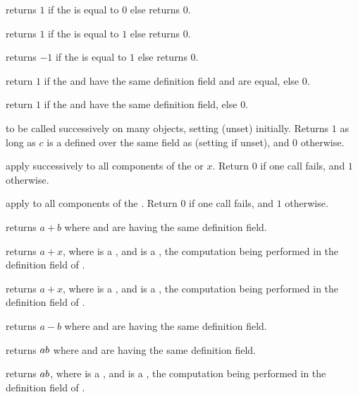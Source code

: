  returns $1$ if the   is equal
to $0$ else returns $0$.

 returns $1$ if the   is equal
to $1$ else returns $0$.

 returns $-1$ if the   is equal
to $1$ else returns $0$.

 return $1$ if the   and
 have the same definition field and are equal, else $0$.

 return $1$ if the   and
 have the same definition field, else $0$.

 to be called successively on many objects,
setting  (unset) initially. Returns $1$ as long as $c$ is a
 defined over the same field as  (setting 
if unset), and $0$ otherwise.

 apply  successively to all
components of the  or  $x$. Return $0$ if one call fails,
and $1$ otherwise.

 apply  to all components
of the . Return $0$ if one call fails, and $1$ otherwise.

 returns $a+b$ where  and  are
 having the same definition field.

 returns $a+x$, where  is a
, and  is a , the computation being
performed in the definition field of .

 returns $a+x$, where  is a
, and  is a , the computation being
performed in the definition field of .

 returns $a-b$ where  and  are
 having the same definition field.

 returns $a\*b$ where  and  are
 having the same definition field.

 returns $a\*b$, where  is a
, and  is a , the computation being
performed in the definition field of .


